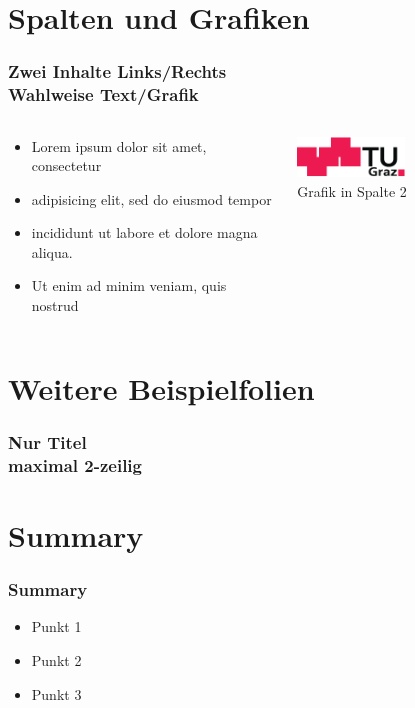 \documentclass{beamer}
\begin{document}
\section{Spalten und Grafiken}
\begin{frame}
	\frametitle{Zwei Inhalte Links/Rechts\\Wahlweise Text/Grafik}
	\begin{columns}[onlytextwidth]
		\begin{column}{0.5\textwidth}
			\begin{itemize}
				\item Lorem ipsum dolor sit amet, consectetur 
				\item adipisicing elit, sed do eiusmod tempor 
				\item incididunt ut labore et dolore magna aliqua. 
				\item Ut enim ad minim veniam, quis nostrud 
			\end{itemize}
		\end{column}
		\begin{column}{0.5\textwidth}
			\begin{center}
			\includegraphics[width=0.5\textwidth]{logo.pdf}\\
			Grafik in Spalte 2
			\end{center}
		\end{column}
	\end{columns}
\end{frame}

\section{Weitere Beispielfolien}

\begin{frame}
	\frametitle{Nur Titel \\maximal 2-zeilig}
\end{frame}


\section{Summary}

\begin{frame}
	\frametitle{Summary}
	\begin{itemize}
		\item Punkt 1
		\item Punkt 2
		\item Punkt 3
	\end{itemize}
\end{frame}

\end{document}
